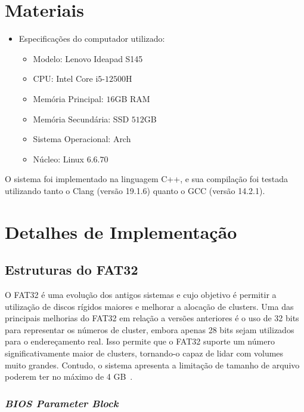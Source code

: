 \documentclass[
    12pt,				%
    oneside,   	        %
    a4paper,			%
    english,			%
    french,				%
    spanish,			%
    brazil,				%
    ]{pacotes/abntex2}
\begin{document}
\section{Materiais}
\label{sec:materiais}

\begin{itemize}
  \item Especificações do computador utilizado:
  \begin{itemize}
    \item Modelo: Lenovo Ideapad S145
    \item CPU: Intel Core i$5$-$12500$H
    \item Memória Principal: $16$GB RAM
    \item Memória Secundária: SSD $512$GB
    \item Sistema Operacional: Arch
  \item Núcleo: Linux $6.6.70$ 
  \end{itemize}
\end{itemize}

O sistema foi implementado na linguagem C++, e sua compilação foi testada utilizando tanto o Clang (versão 19.1.6) quanto o GCC (versão 14.2.1).

\section{Detalhes de Implementação}
\label{sec:implementacao}

\subsection{Estruturas do FAT32}
\label{subsubsec:estrutura_fat}

O FAT32 é uma evolução dos antigos sistemas e cujo objetivo é permitir a utilização de discos rígidos maiores e melhorar a alocação de clusters. Uma das principais melhorias do FAT32 em relação a versões anteriores é o uso de 32 bits para representar os números de cluster, embora apenas 28 bits sejam utilizados para o endereçamento real. Isso permite que o FAT32 suporte um número significativamente maior de clusters, tornando-o capaz de lidar com volumes muito grandes. Contudo, o sistema apresenta a limitação de tamanho de arquivo poderem ter no máximo de 4 GB~\cite{osdev}.

\subsubsection{\textit{BIOS Parameter Block}}
\label{subsubsec:bpb}
\end{document}
